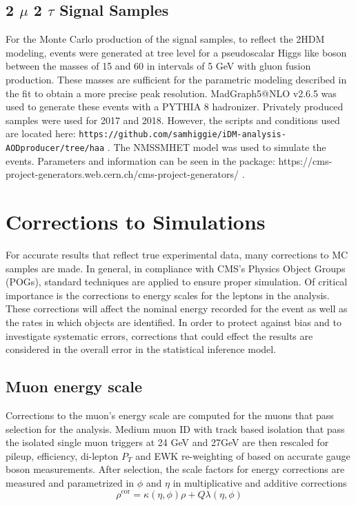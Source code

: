 \subsection{2 $\mu$ 2 $\tau$ Signal Samples }
For the Monte Carlo production of the signal samples, to reflect the 2HDM modeling, events were generated at tree level for a pseudoscalar Higgs like boson between the masses of 15 and 60 in intervals of 5 GeV with gluon fusion production. These masses are sufficient for the parametric modeling described in the fit to obtain a more precise peak resolution.
MadGraph5@NLO v2.6.5 was used to generate these events with a PYTHIA 8 hadronizer. Privately produced samples were used for 2017 and 2018. However, the scripts and conditions used are located here:
 \texttt{https://github.com/samhiggie/iDM-analysis-AODproducer/tree/haa} .
The NMSSMHET model was used to simulate the events. Parameters and information can be seen in the package:
https://cms-project-generators.web.cern.ch/cms-project-generators/ .
 


\section{Corrections to Simulations }

For accurate results that reflect true experimental data, many corrections to MC samples are made. In general, in compliance with CMS's Physics Object Groups (POGs), standard techniques are applied to ensure proper simulation. Of critical importance is the corrections to energy scales for the leptons in the analysis. These corrections will affect the nominal energy recorded for the event as well as the rates in which objects are identified.  In order to protect against bias and to investigate systematic errors, corrections that could effect the results are considered in the overall error in the statistical inference model.

\subsection{Muon energy scale}
Corrections to the muon's energy scale are computed for the muons that pass selection for the analysis. Medium muon ID with track based isolation that pass the isolated single muon triggers at 24 GeV and 27GeV are then rescaled for pileup, efficiency, di-lepton $P_T$ and EWK re-weighting of based on accurate gauge boson measurements. After selection, the scale factors for energy corrections are measured and parametrized in $\phi$ and $\eta$ in multiplicative and additive corrections 
\[\rho^{\text{cor}}=\kappa(\eta,\phi)\rho+Q \lambda(\eta,\phi)\] 

